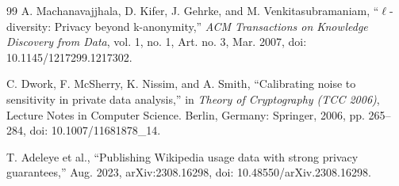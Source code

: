 \begin{thebibliography}{99}
A. Machanavajjhala, D. Kifer, J. Gehrke, and M. Venkitasubramaniam, ``$\ell$-diversity: Privacy beyond k-anonymity,'' \emph{ACM Transactions on Knowledge Discovery from Data}, vol. 1, no. 1, Art. no. 3, Mar. 2007, doi: 10.1145/1217299.1217302.

C. Dwork, F. McSherry, K. Nissim, and A. Smith, ``Calibrating noise to sensitivity in private data analysis,'' in \emph{Theory of Cryptography (TCC 2006)}, Lecture Notes in Computer Science. Berlin, Germany: Springer, 2006, pp. 265--284, doi: 10.1007/11681878\_14.

T. Adeleye et al., ``Publishing Wikipedia usage data with strong privacy guarantees,'' Aug. 2023, arXiv:2308.16298, doi: 10.48550/arXiv.2308.16298.

\end{thebibliography}
